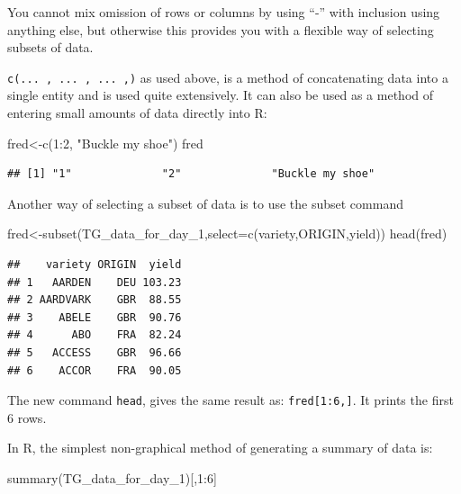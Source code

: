 \documentclass[
]{book}
\newenvironment{Shaded}{\begin{snugshade}}{\end{snugshade}}
\newcommand{\AttributeTok}[1]{\textcolor[rgb]{0.77,0.63,0.00}{#1}}
\newcommand{\DecValTok}[1]{\textcolor[rgb]{0.00,0.00,0.81}{#1}}
\newcommand{\FunctionTok}[1]{\textcolor[rgb]{0.00,0.00,0.00}{#1}}
\newcommand{\NormalTok}[1]{#1}
\newcommand{\OtherTok}[1]{\textcolor[rgb]{0.56,0.35,0.01}{#1}}
\newcommand{\SpecialCharTok}[1]{\textcolor[rgb]{0.00,0.00,0.00}{#1}}
\newcommand{\StringTok}[1]{\textcolor[rgb]{0.31,0.60,0.02}{#1}}
\begin{document}
You cannot mix omission of rows or columns by using ``-'' with inclusion using anything else, but otherwise this provides you with a flexible way of selecting subsets of data.

\texttt{c(...\ ,\ ...\ ,\ ...\ ,)} as used above, is a method of concatenating data into a single entity and is used quite extensively. It can also be used as a method of entering small amounts of data directly into R:

\begin{Shaded}
\begin{Highlighting}[]
\NormalTok{fred}\OtherTok{\textless{}{-}}\FunctionTok{c}\NormalTok{(}\DecValTok{1}\SpecialCharTok{:}\DecValTok{2}\NormalTok{, }\StringTok{"Buckle my shoe"}\NormalTok{)}
\NormalTok{fred}
\end{Highlighting}
\end{Shaded}

\begin{verbatim}
## [1] "1"              "2"              "Buckle my shoe"
\end{verbatim}

Another way of selecting a subset of data is to use the subset command

\begin{Shaded}
\begin{Highlighting}[]
\NormalTok{fred}\OtherTok{\textless{}{-}}\FunctionTok{subset}\NormalTok{(TG\_data\_for\_day\_1,}\AttributeTok{select=}\FunctionTok{c}\NormalTok{(variety,ORIGIN,yield))}
\FunctionTok{head}\NormalTok{(fred)}
\end{Highlighting}
\end{Shaded}

\begin{verbatim}
##    variety ORIGIN  yield
## 1   AARDEN    DEU 103.23
## 2 AARDVARK    GBR  88.55
## 3    ABELE    GBR  90.76
## 4      ABO    FRA  82.24
## 5   ACCESS    GBR  96.66
## 6    ACCOR    FRA  90.05
\end{verbatim}

The new command \texttt{head}, gives the same result as: \texttt{fred{[}1:6,{]}}. It prints the first 6 rows.

In R, the simplest non-graphical method of generating a summary of data is:

\begin{Shaded}
\begin{Highlighting}[]
\FunctionTok{summary}\NormalTok{(TG\_data\_for\_day\_1)[,}\DecValTok{1}\SpecialCharTok{:}\DecValTok{6}\NormalTok{]}
\end{Highlighting}
\end{Shaded}
\end{document}
